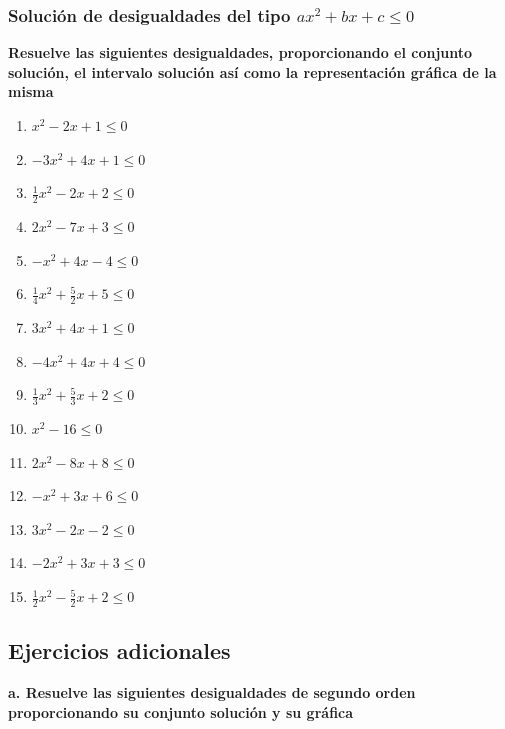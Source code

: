 \documentclass[12pt]{article}
\theoremstyle{plain}
\theoremstyle{definition}
\theoremstyle{remark}
\begin{document}
{\subsubsection{Solución de desigualdades del tipo \(ax^2+bx+c\leq 0\)}
\textbf{Resuelve las siguientes desigualdades, proporcionando el conjunto solución, el intervalo solución así como la representación gráfica de la misma}

\begin{enumerate}
\def\labelenumi{\arabic{enumi}.}
\item
  \(x^2-2x+1\leq0\)
\item
  \(-3x^2+4x+1\leq0\)
\item
  \(\frac{1}{2}x^2-2x+2\leq0\)
\item
  \(2x^2-7x+3\leq0\)
\item
  \(-x^2+4x-4\leq0\)
\item
  \(\frac{1}{4}x^2+\frac{5}{2}x+5\leq0\)
\item
  \(3x^2+4x+1\leq0\)
\item
  \(-4x^2+4x+4\leq0\)
\item
  \(\frac{1}{3}x^2+\frac{5}{3}x+2\leq0\)
\item
  \(x^2-16\leq0\)
\item
  \(2x^2-8x+8\leq0\)
\item
  \(-x^2+3x+6\leq0\)
\item
  \(3x^2-2x-2\leq0\)
\item
  \(-2x^2+3x+3\leq0\)
\item
  \(\frac{1}{2}x^2-\frac{5}{2}x+2\leq0\)
\end{enumerate}

\subsection{Ejercicios adicionales}\label{ejercicios-adicionales-1}

\textbf{a. Resuelve las siguientes desigualdades de segundo orden
proporcionando su conjunto solución y su gráfica}

}
\end{document}
